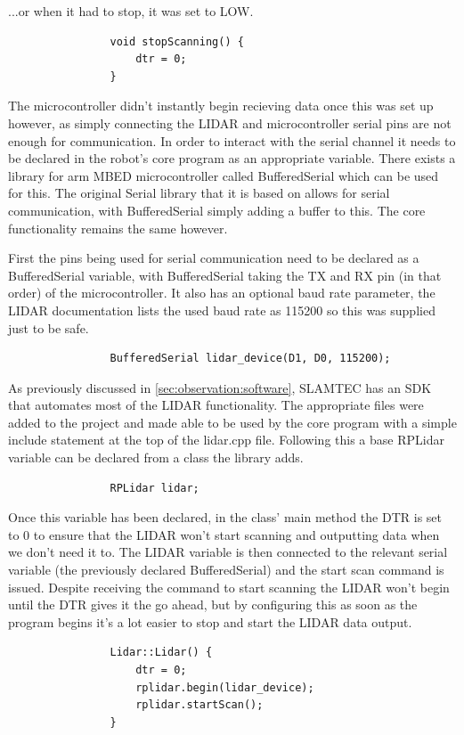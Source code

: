 				...or when it had to stop, it was set to LOW.
				\begin{lstlisting}
				void stopScanning() {
					dtr = 0;
				}
				\end{lstlisting}
				
				The microcontroller didn't instantly begin recieving data once this was set up however, as simply connecting the LIDAR and microcontroller serial pins are not enough for communication. In order to interact with the serial channel it needs to be declared in the robot's core program as an appropriate variable. There exists a library for arm MBED microcontroller called BufferedSerial which can be used for this. The original Serial library that it is based on allows for serial communication, with BufferedSerial simply adding a buffer to this. The core functionality remains the same however.
				
				First the pins being used for serial communication need to be declared as a BufferedSerial variable, with BufferedSerial taking the TX and RX pin (in that order) of the microcontroller. It also has an optional baud rate parameter, the LIDAR documentation lists the used baud rate as 115200 so this was supplied just to be safe.
				\begin{lstlisting}
				BufferedSerial lidar_device(D1, D0, 115200);
				\end{lstlisting}
				
				As previously discussed in \ref{sec:observation:software}, SLAMTEC has an SDK that automates most of the LIDAR functionality. The appropriate files were added to the project and made able to be used by the core program with a simple include statement at the top of the lidar.cpp file.
				Following this a base RPLidar variable can be declared from a class the library adds.
				\begin{lstlisting}
				RPLidar lidar;
				\end{lstlisting}
				
				Once this variable has been declared, in the class' main method the DTR is set to 0 to ensure that the LIDAR won't start scanning and outputting data when we don't need it to. The LIDAR variable is then connected to the relevant serial variable (the previously declared BufferedSerial) and the start scan command is issued. Despite receiving the command to start scanning the LIDAR won't begin until the DTR gives it the go ahead, but by configuring this as soon as the program begins it's a lot easier to stop and start the LIDAR data output.
				\begin{lstlisting}
				Lidar::Lidar() {
					dtr = 0;
					rplidar.begin(lidar_device);
					rplidar.startScan();
				}
				\end{lstlisting}
				
